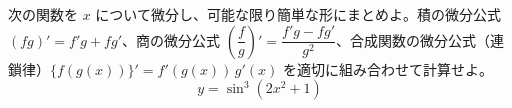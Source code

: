 
次の関数を $x$ について微分し、可能な限り簡単な形にまとめよ。積の微分公式 $(fg)' = f'g + fg'$、商の微分公式 $\left(\dfrac{f}{g}\right)' = \dfrac{f'g - fg'}{g^{2}}$、合成関数の微分公式（連鎖律）$\{f(g(x))\}' = f'(g(x))\,g'(x)$ を適切に組み合わせて計算せよ。
\[
y = \sin^{3}\!\left(2x^{2} + 1\right)
\]
